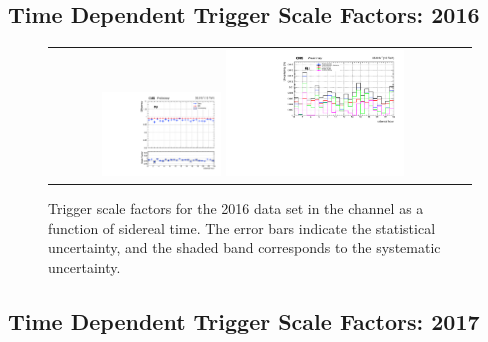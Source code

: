 \subsection{Time Dependent Trigger Scale Factors: 2016}
\label{TrigSFResults_SideReal_2016}

\begin{figure}[htb]
  \begin{center}
    \begin{tabular}{cc}
      \includegraphics[width=0.30\textwidth]{fig_2016_sidereal/g_emu_sidereel_FullSystUncBand.pdf}
      \includegraphics[width=0.45\textwidth]{fig_2016_sidereal/g_emu_sidereel_ErrorsBreakdown.pdf}\\
    \end{tabular}
    \caption{Trigger scale factors for the 2016 data set in the \emu channel as a function of sidereal time.
            The error bars indicate the statistical uncertainty, and the shaded band corresponds to the systematic uncertainty.
            }
    \label{TrigSF_SideReal_2016_1}
  \end{center}
\end{figure}

\subsection{Time Dependent Trigger Scale Factors: 2017}
\label{TrigSFResults_SideReal_2017}

